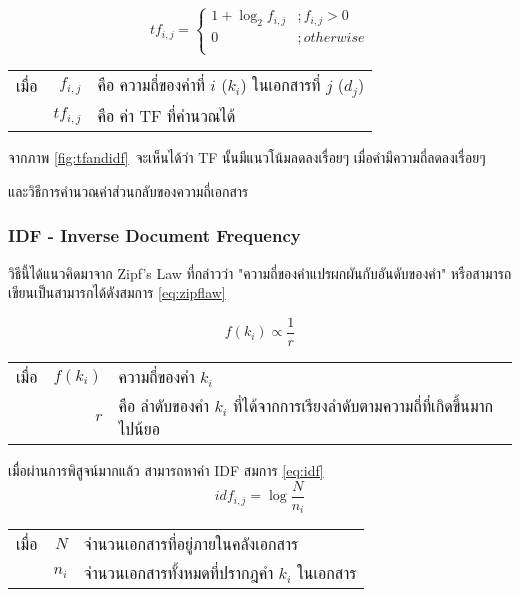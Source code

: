 \documentclass[11pt,a4paper]{article}
\begin{document}
\begin{equation}
    tf_{i,j} = 
    \begin{cases}
        1 + \log_2{f_{i,j}} &; f_{i,j} > 0 \\
        0                   &; otherwise \\
    \end{cases}
    \label{eq:tf}
\end{equation}

\begin{table}[ht!]
    \begin{tabular}{lrl}
        เมื่อ & $f_{i,j}$     & คือ ความถี่ของคำที่ $i$ ($k_{i}$) ในเอกสารที่ $j$ ($d_{j}$) \\
            & $tf_{i,j}$    & คือ ค่า TF ที่คำนวณได้
    \end{tabular}
\end{table}

จากภาพ \ref{fig:tfandidf}\ จะเห็นได้ว่า TF นั้นมีแนวโน้มลดลงเรื่อยๆ เมื่อคำมีความถี่ลดลงเรื่อยๆ 

และวิธีการคำนวณค่าส่วนกลับของความถี่เอกสาร

\subsubsection{IDF - Inverse Document Frequency}

วิธีนี้ได้แนวคิดมาจาก Zipf's Law ที่กล่าวว่า "ความถี่ของคำแปรผกผันกับอันดับของคำ" หรือสามารถเขียนเป็นสามารกได้ดังสมการ \ref{eq:zipflaw} 

\begin{equation}
    f(k_{i}) \propto \frac{1}{r}
    \label{eq:zipflaw}
\end{equation}

\begin{table}[ht!]
    \begin{tabular}{lrl}
        เมื่อ & $f(k_{i})$        & ความถี่ของคำ $k_i$  \\
            & $r$               & คือ ลำดับของคำ $k_i$ ที่ได้จากการเรียงลำดับตามความถี่ที่เกิดขึ้นมากไปน้ยอ 
    \end{tabular}
\end{table}

เมื่อผ่านการพิสูจน์มากแล้ว สามารถหาค่า IDF สมการ \ref{eq:idf}
\begin{equation}
    idf_{i,j} = \log{\frac{N}{n_i}}
    \label{eq:idf}
\end{equation}
\begin{table}[ht!]
    \begin{tabular}{lrl}
        เมื่อ & $N$   & จำนวนเอกสารที่อยู่ภายในคลังเอกสาร\\
            & $n_i$ & จำนวนเอกสารทั้งหมดที่ปรากฎคำ $k_i$ ในเอกสาร
    \end{tabular}
\end{table}
\end{document}
